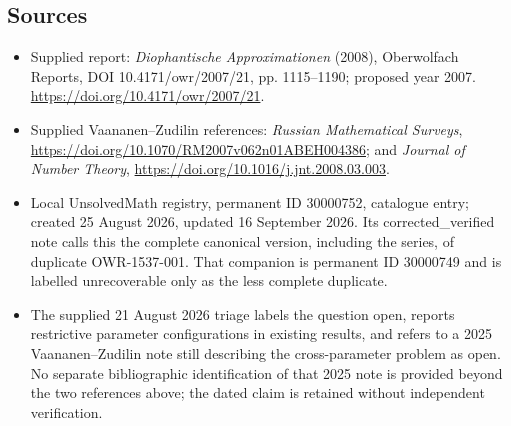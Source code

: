 \documentclass[11pt]{article}
\begin{document}
\subsection{Sources}
\begin{itemize}
\item Supplied report: \emph{Diophantische Approximationen} (2008), Oberwolfach Reports, DOI 10.4171/owr/2007/21, pp. 1115--1190; proposed year 2007. \url{https://doi.org/10.4171/owr/2007/21}.
\item Supplied Vaananen--Zudilin references: \emph{Russian Mathematical Surveys}, \url{https://doi.org/10.1070/RM2007v062n01ABEH004386}; and \emph{Journal of Number Theory}, \url{https://doi.org/10.1016/j.jnt.2008.03.003}.
\item Local UnsolvedMath registry, permanent ID 30000752, catalogue entry; created 25 August 2026, updated 16 September 2026. Its corrected\_verified note calls this the complete canonical version, including the series, of duplicate OWR-1537-001. That companion is permanent ID 30000749 and is labelled unrecoverable only as the less complete duplicate.
\item The supplied 21 August 2026 triage labels the question open, reports restrictive parameter configurations in existing results, and refers to a 2025 Vaananen--Zudilin note still describing the cross-parameter problem as open. No separate bibliographic identification of that 2025 note is provided beyond the two references above; the dated claim is retained without independent verification.
\end{itemize}
\end{document}
